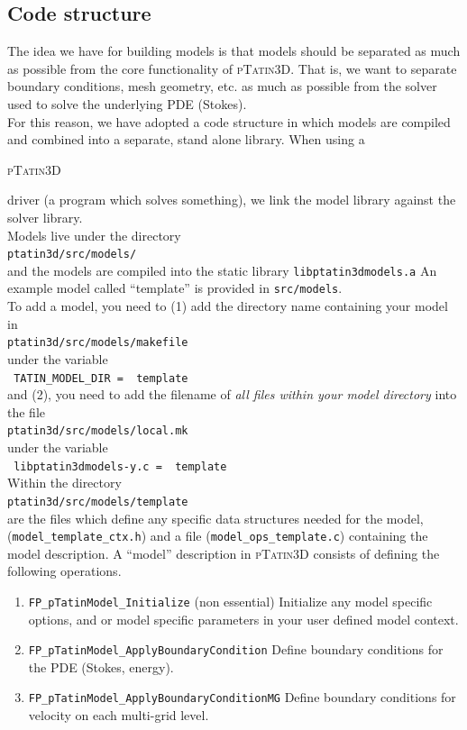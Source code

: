 \documentclass[paper=a4, fontsize=11pt,twoside]{scrartcl}
\newcommand{\ptat}{{{\textsc{pTatin3D}}}}
\newcommand{\shellcmd}[1]{\\\indent\indent\texttt{\hspace{5mm}\footnotesize #1}\\}
\newcommand{\unix}[1]{\texttt{\footnotesize #1}}
\begin{document}
\subsection{Code structure}
The idea we have for building models is that models should be separated as much as possible
from the core functionality of {\ptat}. That is, we want to separate boundary conditions,
mesh geometry, etc. as much as possible from the solver used to solve the underlying PDE (Stokes).
\\[8pt]
For this reason, we have adopted a code structure in which models are compiled and combined into
a separate, stand alone library. When using a {\ptat{ driver (a program which solves something),
we link the model library against the solver library.
\\[8pt]
Models live under the directory
	\shellcmd{ptatin3d/src/models/}
and the models are compiled into the static library \unix{libptatin3dmodels.a}
An example model called ``template'' is provided in \unix{src/models}.
\\[8pt]
To add a model, you need to (1) add the directory name containing your model in
	\shellcmd{ptatin3d/src/models/makefile}
under the variable
	\shellcmd{
	TATIN\_MODEL\_DIR = \
        template
	}
and (2), you need to add the filename of \textit{all files within your model directory} into the file
	\shellcmd{ptatin3d/src/models/local.mk}
under the variable
	\shellcmd{
	libptatin3dmodels-y.c = \
        template
	}
Within the directory
	\shellcmd{ptatin3d/src/models/template}
are the files which define any specific data structures needed for the model,
	(\unix{model\_template\_ctx.h})
and a file (\unix{model\_ops\_template.c}) containing the model description.
A ``model'' description in {\ptat} consists of defining the following operations.
\begin{enumerate}
	\item \unix{FP\_pTatinModel\_Initialize} (non essential)
	Initialize any model specific options, and or model specific parameters in your user defined model context.

	\item \unix{FP\_pTatinModel\_ApplyBoundaryCondition}
	Define boundary conditions for the PDE (Stokes, energy).

	\item \unix{FP\_pTatinModel\_ApplyBoundaryConditionMG}
	Define boundary conditions for velocity on each multi-grid level.


\end{enumerate}}}
\end{document}
